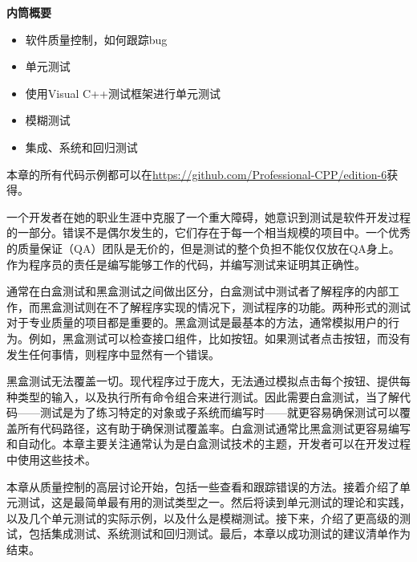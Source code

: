 \noindent
\textbf{内筒概要}

\begin{itemize}
\item
软件质量控制，如何跟踪bug

\item
单元测试

\item
使用Visual C++测试框架进行单元测试

\item
模糊测试

\item
集成、系统和回归测试
\end{itemize}

本章的所有代码示例都可以在\url{https://github.com/Professional-CPP/edition-6}获得。

一个开发者在她的职业生涯中克服了一个重大障碍，她意识到测试是软件开发过程的一部分。错误不是偶尔发生的，它们存在于每一个相当规模的项目中。一个优秀的质量保证（QA）团队是无价的，但是测试的整个负担不能仅仅放在QA身上。作为程序员的责任是编写能够工作的代码，并编写测试来证明其正确性。

通常在白盒测试和黑盒测试之间做出区分，白盒测试中测试者了解程序的内部工作，而黑盒测试则在不了解程序实现的情况下，测试程序的功能。两种形式的测试对于专业质量的项目都是重要的。黑盒测试是最基本的方法，通常模拟用户的行为。例如，黑盒测试可以检查接口组件，比如按钮。如果测试者点击按钮，而没有发生任何事情，则程序中显然有一个错误。

黑盒测试无法覆盖一切。现代程序过于庞大，无法通过模拟点击每个按钮、提供每种类型的输入，以及执行所有命令组合来进行测试。因此需要白盒测试，当了解代码——测试是为了练习特定的对象或子系统而编写时——就更容易确保测试可以覆盖所有代码路径，这有助于确保测试覆盖率。白盒测试通常比黑盒测试更容易编写和自动化。本章主要关注通常认为是白盒测试技术的主题，开发者可以在开发过程中使用这些技术。

本章从质量控制的高层讨论开始，包括一些查看和跟踪错误的方法。接着介绍了单元测试，这是最简单最有用的测试类型之一。然后将读到单元测试的理论和实践，以及几个单元测试的实际示例，以及什么是模糊测试。接下来，介绍了更高级的测试，包括集成测试、系统测试和回归测试。最后，本章以成功测试的建议清单作为结束。

